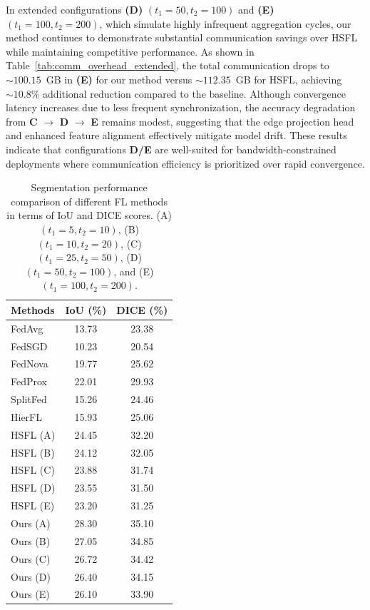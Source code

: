 \documentclass[letterpaper]{article} %
\begin{document}
    In extended configurations \textbf{(D)} $(t_1=50, t_2=100)$ and \textbf{(E)} $(t_1=100, t_2=200)$, which simulate highly infrequent aggregation cycles, our method continues to demonstrate substantial communication savings over HSFL while maintaining competitive performance. As shown in Table~\ref{tab:comm_overhead_extended}, the total communication drops to $\sim100.15$~GB in \textbf{(E)} for our method versus $\sim112.35$~GB for HSFL, achieving $\sim10.8\%$ additional reduction compared to the baseline. Although convergence latency increases due to less frequent synchronization, the accuracy degradation from \textbf{C} $\rightarrow$ \textbf{D} $\rightarrow$ \textbf{E} remains modest, suggesting that the edge projection head and enhanced feature alignment effectively mitigate model drift. These results indicate that configurations \textbf{D/E} are well-suited for bandwidth-constrained deployments where communication efficiency is prioritized over rapid convergence.
    \begin{table}
        \centering
        \begin{tabular}{l|c|c}
        \hline
        \textbf{Methods} & \textbf{IoU (\%)} & \textbf{DICE (\%)} \\ \hline
        FedAvg    & 13.73  & 23.38 \\ 
        FedSGD    & 10.23  & 20.54 \\ 
        FedNova   & 19.77  & 25.62 \\ 
        FedProx   & 22.01  & 29.93 \\ \hline
        SplitFed  & 15.26  & 24.46 \\ \hline
        HierFL    & 15.93  & 25.06 \\ \hline
        HSFL (A)  & 24.45 & 32.20 \\
        HSFL (B)  & 24.12 & 32.05 \\
        HSFL (C)  & 23.88 & 31.74 \\
        HSFL (D)  & 23.55 & 31.50 \\
        HSFL (E)  & 23.20 & 31.25 \\ \hline
        Ours (A)  & 28.30 & 35.10 \\
        Ours (B)  & 27.05 & 34.85 \\
        Ours (C)  & 26.72 & 34.42 \\
        Ours (D)  & 26.40 & 34.15 \\
        Ours (E)  & 26.10 & 33.90 \\ \hline
        \end{tabular}
        \caption{Segmentation performance comparison of different FL methods in terms of IoU and DICE scores. (A) $(t_1=5, t_2=10)$, (B) $(t_1=10, t_2=20)$, (C) $(t_1=25, t_2=50)$, (D) $(t_1=50, t_2=100)$, and (E) $(t_1=100, t_2=200)$.}
        \label{tab:segmentation_extended}
    \end{table}
\end{document}
